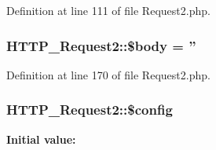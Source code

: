 Definition at line 111 of file Request2.\-php.

\hypertarget{classHTTP__Request2_af7de92496442c98589954db8327f9faf}{
\subsubsection[{\$body}]{\setlength{\rightskip}{0pt plus 5cm}H\-T\-T\-P\-\_\-\-Request2\-::\$body = ''\hspace{0.3cm}{\ttfamily [protected]}}}\label{classHTTP__Request2_af7de92496442c98589954db8327f9faf}


Definition at line 170 of file Request2.\-php.

\hypertarget{classHTTP__Request2_a4043f1c6f00d8b92d2b3dcb5ecd2861e}{
\subsubsection[{\$config}]{\setlength{\rightskip}{0pt plus 5cm}H\-T\-T\-P\-\_\-\-Request2\-::\$config\hspace{0.3cm}{\ttfamily [protected]}}}\label{classHTTP__Request2_a4043f1c6f00d8b92d2b3dcb5ecd2861e}
{\bfseries Initial value\-:}
